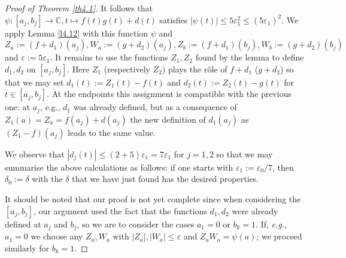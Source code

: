 \documentclass[12pt,fleqn]{amsart}
\theoremstyle{definition}
\numberwithin{equation}{section}
\theoremstyle{remark}
\begin{document}
\begin{proof}[Proof of Theorem \ref{th4.1}]
    It follows that $\psi\colon \left[a_{j}, b_{j}\right] \rightarrow \mathbb{C}, t \mapsto f(t) g(t)+d(t)$ satisfies $|\psi(t)| \leqslant 5 \varepsilon_{1}^{2} \leqslant  (5 \varepsilon_{1})^{2}$. We apply Lemma \ref{l4.12} with this function $\psi$ and
    \[ Z_{a}:=\left(f+d_{1}\right)\left(a_{j}\right), W_{a}:=\left(g+d_{2}\right)\left(a_{j}\right), Z_{b}:=\left(f+d_{1}\right)\left(b_{j}\right), W_{b}:=\left(g+d_{2}\right)\left(b_{j}\right)
    \]
    and $\varepsilon:=5 \varepsilon_{1}$. It remains to use the functions $Z_{1}, Z_{2}$ found by the lemma to define $d_{1}, d_{2}$ on $\left[a_{j}, b_{j}\right]$. Here $Z_{1}$ (respectively $Z_{2}$) plays the r\^{o}le of $f+d_{1}$ ($g+d_{2}$) so that we may set $d_{1}(t):=Z_{1}(t)-f(t)$ and $d_{2}(t):=Z_{2}(t)-g(t)$ for $t \in\left[a_{j}, b_{j}\right]$. At the endpoints this assignment is compatible with the previous one: at $a_{j}$, e.g., $d_{1}$ was already defined, but as a consequence of $Z_{1}(a)=Z_{a}=f\left(a_{j}\right)+d\left(a_{j}\right)$ the new definition of $d_{1}\left(a_{j}\right)$ as $\left(Z_{1}-f\right)\left(a_{j}\right)$ leads to the same value.

    We observe that $\left|d_{j}(t)\right| \leqslant (2+5)\varepsilon_{1} = 7 \varepsilon_{1}$ for $j=1,2$ so that we may summarise the above calculations as follows: if one starts with $\varepsilon_{1}:=\varepsilon_{0} / 7$, then $\delta_{0}:=\delta$ with the $\delta$ that we have just found has the desired properties.\smallskip

    It should be noted that our proof is not yet complete since when considering the $\left[a_{j}, b_{j}\right]$, our argument used the fact that the functions $d_{1}, d_{2}$ were already defined at $a_{j}$ and $b_{j}$, so we are to consider the cases $a_{1}=0$ or $b_{k}=1$. If, \emph{e.g.}, $a_{1}=0$ we choose any $Z_{a}, W_{a}$ with $\left|Z_{a}\right|,\left|W_{a}\right| \leqslant \varepsilon$ and $Z_{a} W_{a}=\psi(a)$; we proceed similarly for $b_k=1$.
\end{proof}
\end{document}
